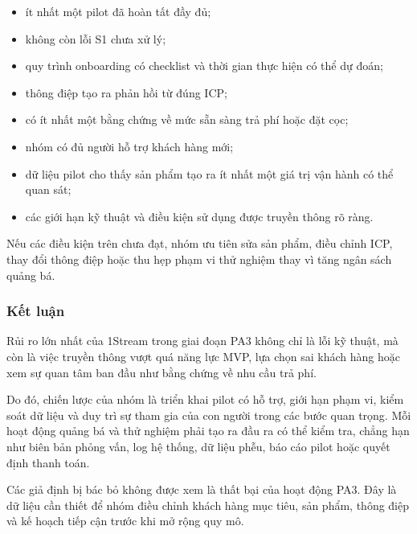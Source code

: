 \begin{itemize}
    \item ít nhất một pilot đã hoàn tất đầy đủ;
    \item không còn lỗi S1 chưa xử lý;
    \item quy trình onboarding có checklist và thời gian thực hiện có thể dự đoán;
    \item thông điệp tạo ra phản hồi từ đúng ICP;
    \item có ít nhất một bằng chứng về mức sẵn sàng trả phí hoặc đặt cọc;
    \item nhóm có đủ người hỗ trợ khách hàng mới;
    \item dữ liệu pilot cho thấy sản phẩm tạo ra ít nhất một giá trị vận hành có thể quan sát;
    \item các giới hạn kỹ thuật và điều kiện sử dụng được truyền thông rõ ràng.
\end{itemize}

Nếu các điều kiện trên chưa đạt, nhóm ưu tiên sửa sản phẩm, điều chỉnh ICP, thay đổi thông điệp hoặc thu hẹp phạm vi thử nghiệm thay vì tăng ngân sách quảng bá.

\subsubsection{Kết luận}

Rủi ro lớn nhất của 1Stream trong giai đoạn PA3 không chỉ là lỗi kỹ thuật, mà còn là việc truyền thông vượt quá năng lực MVP, lựa chọn sai khách hàng hoặc xem sự quan tâm ban đầu như bằng chứng về nhu cầu trả phí.

Do đó, chiến lược của nhóm là triển khai pilot có hỗ trợ, giới hạn phạm vi, kiểm soát dữ liệu và duy trì sự tham gia của con người trong các bước quan trọng. Mỗi hoạt động quảng bá và thử nghiệm phải tạo ra đầu ra có thể kiểm tra, chẳng hạn như biên bản phỏng vấn, log hệ thống, dữ liệu phễu, báo cáo pilot hoặc quyết định thanh toán.

Các giả định bị bác bỏ không được xem là thất bại của hoạt động PA3. Đây là dữ liệu cần thiết để nhóm điều chỉnh khách hàng mục tiêu, sản phẩm, thông điệp và kế hoạch tiếp cận trước khi mở rộng quy mô.